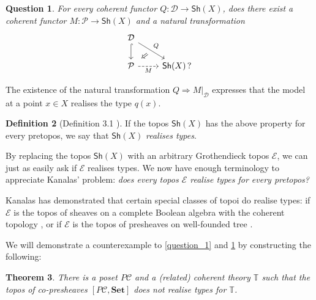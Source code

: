 \documentclass{article}
\theoremstyle{plain}
\newtheorem{thm}{Theorem}[section]
\newtheorem{question}[thm]{Question}
\theoremstyle{definition}
\newtheorem{df}[thm]{Definition}
\newcommand{\cat}{\mathcal{C}}
\newcommand{\dcat}{\mathcal{D}}
\newcommand{\pretopos}{\mathcal{P}}
\newcommand{\Sh}{\mathsf{Sh}}
\newcommand{\topos}{\mathcal{E}}
\newcommand{\Set}{\mathbf{Set}}
\begin{document}
	\begin{question}\label{question_2}
		For every coherent functor $Q \colon \dcat \to \Sh(X)$, does there exist a coherent functor $M \colon \pretopos \to \Sh(X)$ and a natural transformation
		\[\begin{tikzcd}
			\dcat & \\
			\pretopos & {\Sh(X)} \, ?
			\arrow[hook, from=1-1, to=2-1]
			\arrow[""{name=0, anchor=center, inner sep=0}, "Q", from=1-1, to=2-2]
			\arrow["M"', dashed, from=2-1, to=2-2]
			\arrow["\Rightarrow"{marking, allow upside down}, draw=none, from=0, to=2-1]
		\end{tikzcd}\]
	\end{question}
	
	The existence of the natural transformation $Q \Rightarrow M|_{\dcat}$ expresses that the model at a point $x \in X$ realises the type $q(x)$.
	\begin{df}[Definition 3.1 \cite{kanalas_apal}]
		If the topos $\Sh(X)$ has the above property for every pretopos, we say that $\Sh(X)$ \emph{realises types}.
	\end{df}
	By replacing the topos $\Sh(X)$ with an arbitrary Grothendieck topos $\topos$, we can just as easily ask if $\topos$ realises types.  We now have enough terminology to appreciate Kanalas' problem: {\it does every topos $\topos$ realise types for every pretopos?}
	
	
	Kanalas has demonstrated that certain special classes of topoi do realise types: if $\topos$ is the topos of sheaves on a complete Boolean algebra with the coherent topology \cite[Theorem 3.5]{kanalas_phd}, or if $\topos$ is the topos of presheaves on well-founded tree \cite{kanalas_talk_2}.  
	
	
	We will demonstrate a counterexample to \cref{question_1} and \cref{question_2} by constructing the following:
	\begin{thm}
		There is a poset $P\cat$ and a (related) coherent theory $\mathbb{T}$ such that the topos of co-presheaves $[P\cat, \Set]$ does not realise types for $\mathbb{T}$.
	\end{thm}
	
\end{document}
